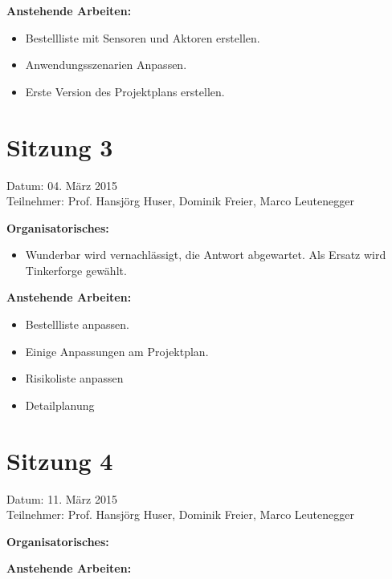 \textbf{Anstehende Arbeiten:}
\begin{itemize}
	\item Bestellliste mit Sensoren und Aktoren erstellen.
	\item Anwendungsszenarien Anpassen.
	\item Erste Version des Projektplans erstellen.
\end{itemize}

\section*{Sitzung 3}
Datum: 04. März 2015 \\
Teilnehmer: Prof. Hansjörg Huser, Dominik Freier, Marco Leutenegger

\textbf{Organisatorisches:}
\begin{itemize}
	\item Wunderbar wird vernachlässigt, die Antwort abgewartet. Als Ersatz wird Tinkerforge gewählt.
\end{itemize}

\textbf{Anstehende Arbeiten:}
\begin{itemize}
	\item Bestellliste anpassen.
	\item Einige Anpassungen am Projektplan.
	\item Risikoliste anpassen
	\item Detailplanung
\end{itemize}

\section*{Sitzung 4}
Datum: 11. März 2015 \\
Teilnehmer: Prof. Hansjörg Huser, Dominik Freier, Marco Leutenegger

\textbf{Organisatorisches:}

\textbf{Anstehende Arbeiten:}

